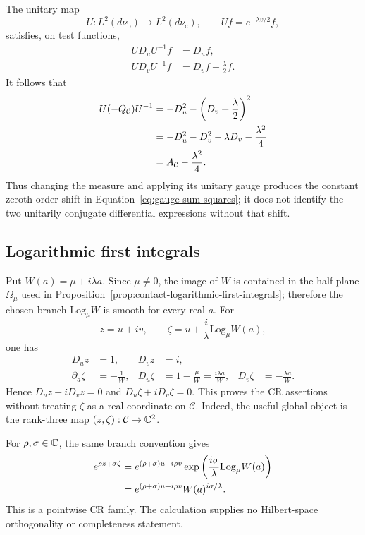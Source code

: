 The unitary map
\[
 U:L^2(d\nu_{\mathrm b})\longrightarrow L^2(d\nu_{\mathrm c}),
 \qquad Uf=e^{-\lambda v/2}f,
\]
satisfies, on test functions,
\begin{align}
 UD_uU^{-1}f&=D_uf,\label{eq:app-gauge-Du}\\
 UD_vU^{-1}f&=D_vf+\frac{\lambda}{2}f.
 \label{eq:app-gauge-Dv}
\end{align}
It follows that
\begin{align}
 U(-Q_{\mathcal C})U^{-1}
 &=-D_u^2-\left(D_v+\frac{\lambda}{2}\right)^2\notag\\
 &=-D_u^2-D_v^2-\lambda D_v-\frac{\lambda^2}{4}\notag\\
 &=A_{\mathcal C}-\frac{\lambda^2}{4}.
 \label{eq:app-gauge-energy}
\end{align}
Thus changing the measure and applying its unitary gauge produces the constant
zeroth-order shift in Equation~\eqref{eq:gauge-sum-squares}; it does not identify the
two unitarily conjugate differential expressions without that shift.

\subsection{Logarithmic first integrals}

Put $W(a)=\mu+i\lambda a$.  Since $\mu\ne0$, the image of $W$ is contained
in the half-plane $\Omega_\mu$ used in
Proposition~\ref{prop:contact-logarithmic-first-integrals}; therefore the chosen
branch $\mathrm{Log}_\mu W$ is smooth for every real $a$.  For
\[
 z=u+iv,
 \qquad
 \zeta=u+\frac{i}{\lambda}\mathrm{Log}_\mu W(a),
\]
one has
\begin{align}
 D_uz&=1,&D_vz&=i,\label{eq:app-z-derivatives}\\
 \partial_a\zeta&=-\frac1W,&
 D_u\zeta&=1-\frac{\mu}{W}=\frac{i\lambda a}{W},&
 D_v\zeta&=-\frac{\lambda a}{W}.
 \label{eq:app-zeta-derivatives}
\end{align}
Hence $D_uz+iD_vz=0$ and
$D_u\zeta+iD_v\zeta=0$.  This proves the CR assertions without treating
$\zeta$ as a real coordinate on $\mathcal C$.  Indeed, the useful global
object is the rank-three map $(z,\zeta):\mathcal C\to\mathbb{C}^2$.

For $\rho,\sigma\in\mathbb{C}$, the same branch convention gives
\begin{align}
 e^{\rho z+\sigma\zeta}
 &=e^{(\rho+\sigma)u+i\rho v}
   \exp\left(\frac{i\sigma}{\lambda}\mathrm{Log}_\mu W(a)\right)\notag\\
 &=e^{(\rho+\sigma)u+i\rho v}
   W(a)^{i\sigma/\lambda}.
 \label{eq:app-contact-mode-expanded}
\end{align}
This is a pointwise CR family.  The calculation supplies no Hilbert-space
orthogonality or completeness statement.

